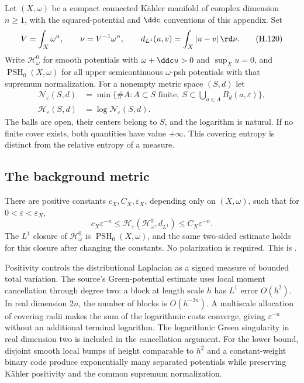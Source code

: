 Let $(X,\omega)$ be a compact connected K\"ahler manifold of complex
dimension $n\geq1$, with the squared-potential and $\ddc$ conventions
of this appendix. Set
\[
 V=\int_X\omega^n,\qquad \nu=V^{-1}\omega^n,
 \qquad d_{L^1}(u,v)=\int_X|u-v|\,\rd\nu.
 \tag{H.120}\label{eq:appH-entropy-background-metric}
\]
Write $\mathcal H^0_\omega$ for smooth potentials with
$\omega+\ddc u>0$ and $\sup_Xu=0$, and
$\operatorname{PSH}_0(X,\omega)$ for all upper semicontinuous
$\omega$-psh potentials with that supremum normalization.
For a nonempty metric space $(S,d)$ let
\[
 \begin{aligned}
 \mathscr N_\varepsilon(S,d)
   &=\min\{\#A:A\subset S\text{ finite},\ S\subset\bigcup_{a\in A}B_d(a,\varepsilon)\},\\
 \mathscr H_\varepsilon(S,d)&=\log\mathscr N_\varepsilon(S,d).
 \end{aligned}
 \tag{H.121}\label{eq:appH-covering-entropy-definition}
\]
The balls are open, their centers belong to $S$, and the logarithm is
natural. If no finite cover exists, both quantities have value $+\infty$.
This covering entropy is distinct from the relative entropy of a measure.

\subsection{The background metric}

\begin{theorem}\label{thm:appH-background-metric-entropy}
There are positive constants $c_X,C_X,\varepsilon_X$, depending only
on $(X,\omega)$, such that for $0<\varepsilon<\varepsilon_X$,
\[
 c_X\varepsilon^{-n}\leq
 \mathscr H_\varepsilon(\mathcal H^0_\omega,d_{L^1})
 \leq C_X\varepsilon^{-n}.
 \tag{H.122}\label{eq:appH-background-entropy-rate}
\]
The $L^1$ closure of $\mathcal H^0_\omega$ is
$\operatorname{PSH}_0(X,\omega)$, and the same two-sided estimate
holds for this closure after changing the constants. No polarization is
required. This is \cite[Theorem~1.1]{Hisamoto26MetricEntropyV1}.
\end{theorem}

Positivity controls the distributional Laplacian as a signed measure
of bounded total variation. The source's Green-potential estimate uses
local moment cancellation through degree two: a block at length scale
$h$ has $L^1$ error $O(h^2)$. In real dimension $2n$, the number of
blocks is $O(h^{-2n})$. A multiscale allocation of covering radii makes
the sum of the logarithmic costs converge, giving
$\varepsilon^{-n}$ without an additional terminal logarithm.
The logarithmic Green singularity in real dimension two is included in
the cancellation argument. For the lower bound, disjoint smooth local
bumps of height comparable to $h^2$ and a constant-weight binary code
produce exponentially many separated potentials while preserving
K\"ahler positivity and the common supremum normalization.

